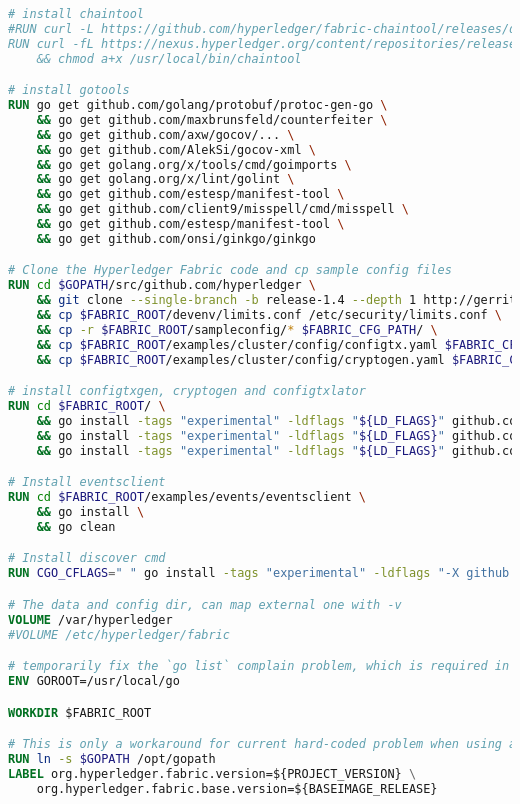 \begin{lstlisting}[language=Dockerfile]
# install chaintool
#RUN curl -L https://github.com/hyperledger/fabric-chaintool/releases/download/v0.10.3/chaintool > /usr/local/bin/chaintool \
RUN curl -fL https://nexus.hyperledger.org/content/repositories/releases/org/hyperledger/fabric/hyperledger-fabric/chaintool-${CHAINTOOL_RELEASE}/hyperledger-fabric-chaintool-${CHAINTOOL_RELEASE}.jar > /usr/local/bin/chaintool \
    && chmod a+x /usr/local/bin/chaintool

# install gotools
RUN go get github.com/golang/protobuf/protoc-gen-go \
    && go get github.com/maxbrunsfeld/counterfeiter \
    && go get github.com/axw/gocov/... \
    && go get github.com/AlekSi/gocov-xml \
    && go get golang.org/x/tools/cmd/goimports \
    && go get golang.org/x/lint/golint \
    && go get github.com/estesp/manifest-tool \
    && go get github.com/client9/misspell/cmd/misspell \
    && go get github.com/estesp/manifest-tool \
    && go get github.com/onsi/ginkgo/ginkgo

# Clone the Hyperledger Fabric code and cp sample config files
RUN cd $GOPATH/src/github.com/hyperledger \
    && git clone --single-branch -b release-1.4 --depth 1 http://gerrit.hyperledger.org/r/fabric \
    && cp $FABRIC_ROOT/devenv/limits.conf /etc/security/limits.conf \
    && cp -r $FABRIC_ROOT/sampleconfig/* $FABRIC_CFG_PATH/ \
    && cp $FABRIC_ROOT/examples/cluster/config/configtx.yaml $FABRIC_CFG_PATH/ \
    && cp $FABRIC_ROOT/examples/cluster/config/cryptogen.yaml $FABRIC_CFG_PATH/

# install configtxgen, cryptogen and configtxlator
RUN cd $FABRIC_ROOT/ \
    && go install -tags "experimental" -ldflags "${LD_FLAGS}" github.com/hyperledger/fabric/common/tools/configtxgen \
    && go install -tags "experimental" -ldflags "${LD_FLAGS}" github.com/hyperledger/fabric/common/tools/cryptogen \
    && go install -tags "experimental" -ldflags "${LD_FLAGS}" github.com/hyperledger/fabric/common/tools/configtxlator

# Install eventsclient
RUN cd $FABRIC_ROOT/examples/events/eventsclient \
    && go install \
    && go clean

# Install discover cmd
RUN CGO_CFLAGS=" " go install -tags "experimental" -ldflags "-X github.com/hyperledger/fabric/cmd/discover/metadata.Version=${BASE_VERSION}" github.com/hyperledger/fabric/cmd/discover

# The data and config dir, can map external one with -v
VOLUME /var/hyperledger
#VOLUME /etc/hyperledger/fabric

# temporarily fix the `go list` complain problem, which is required in chaincode packaging, see core/chaincode/platforms/golang/platform.go#GetDepoymentPayload
ENV GOROOT=/usr/local/go

WORKDIR $FABRIC_ROOT

# This is only a workaround for current hard-coded problem when using as fabric-baseimage.
RUN ln -s $GOPATH /opt/gopath
LABEL org.hyperledger.fabric.version=${PROJECT_VERSION} \
    org.hyperledger.fabric.base.version=${BASEIMAGE_RELEASE}
\end{lstlisting}

